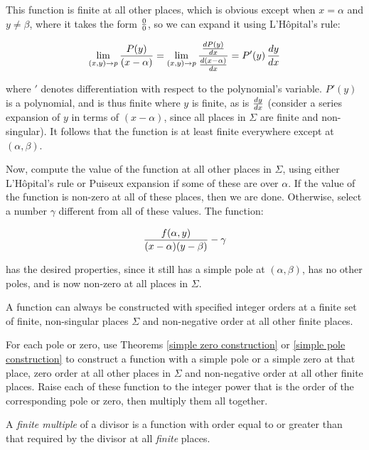This function is finite at all other places, which is obvious except
when $x=\alpha$ and $y\ne\beta$, where it takes the form $0\over0$,
so we can expand it using L'H\^opital's rule:

$$\lim_{(x,y)\to p} {{P(y)}\over(x-\alpha)}
  = \lim_{{(x,y)\to p}} {{{dP(y)}\over{dx}}\over{{d(x-\alpha)}\over{dx}}}
  = P'(y) \, {{dy}\over{dx}} $$

where $'$ denotes differentiation with respect to the polynomial's
variable.  $P'(y)$ is a polynomial, and is thus finite where $y$ is
finite, as is ${dy}\over{dx}$ (consider a series expansion of $y$ in
terms of $(x-\alpha)$, since all places in $\Sigma$ are finite and
non-singular).  It follows that the function is at least finite
everywhere except at $(\alpha, \beta)$.

Now, compute the value of the function at all other places in
$\Sigma$, using either L'H\^opital's rule or Puiseux expansion if some
of these are over $\alpha$.  If the value of the function is non-zero
at all of these places, then we are done.  Otherwise, select a number
$\gamma$ different from all of these values.  The function:

$${f(\alpha,y)\over(x-\alpha)(y-\beta)} - \gamma$$

has the desired properties, since it still has a simple pole at
$(\alpha,\beta)$, has no other poles, and is now non-zero at all
places in $\Sigma$.


\endtheorem

\vfill\eject

\theorem
\label{finite orders construction}

A function can always be constructed with specified integer orders at
a finite set of finite, non-singular places $\Sigma$ and non-negative
order at all other finite places.

\proof

For each pole or zero, use Theorems \ref{simple zero construction} or
\ref{simple pole construction} to construct a function with a simple
pole or a simple zero at that place, zero order at all other places in
$\Sigma$ and non-negative order at all other finite places.  Raise
each of these function to the integer power that is the order of the
corresponding pole or zero, then multiply them all together.

\endtheorem


A {\it finite multiple} of a divisor is a function with order equal to
or greater than that required by the divisor at all {\it finite} places.

